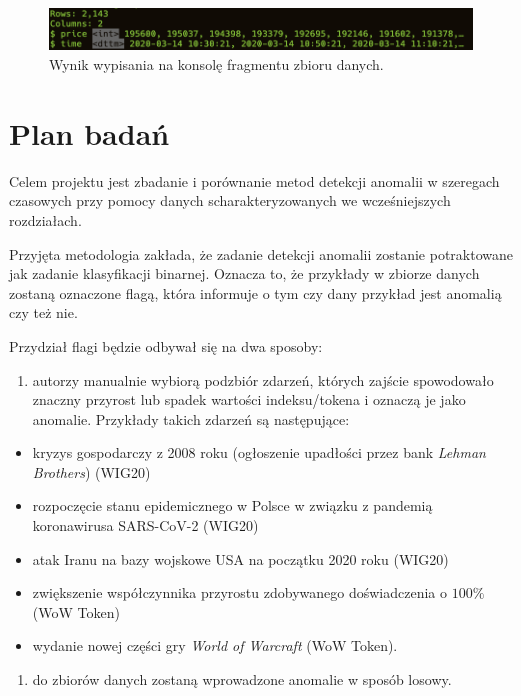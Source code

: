 \documentclass{article}
\begin{document}
\begin{figure}[H]
  \centering
  \includegraphics[width=.75\textwidth]{./images/wt-glimpse.png}
  \caption{Wynik wypisania na konsolę fragmentu zbioru danych.}
\end{figure}


\section{Plan badań \label{r6}}

Celem projektu jest zbadanie i porównanie metod detekcji anomalii w
szeregach czasowych przy pomocy danych scharakteryzowanych we
wcześniejszych rozdziałach.

Przyjęta metodologia zakłada, że zadanie detekcji anomalii zostanie
potraktowane jak zadanie klasyfikacji binarnej. Oznacza to, że przykłady
w zbiorze danych zostaną oznaczone flagą, która informuje o tym czy dany
przykład jest anomalią czy też nie.

Przydział flagi będzie odbywał się na dwa sposoby:

\begin{enumerate}
\def\labelenumi{\arabic{enumi}.}
\item
  autorzy manualnie wybiorą podzbiór zdarzeń, których zajście
  spowodowało znaczny przyrost lub spadek wartości indeksu/tokena i
  oznaczą je jako anomalie. Przykłady takich zdarzeń są następujące:
\end{enumerate}

\begin{itemize}
  \item kryzys gospodarczy z 2008 roku (ogłoszenie upadłości przez bank \emph{Lehman Brothers}) (WIG20)
\item rozpoczęcie stanu epidemicznego w Polsce w związku z pandemią koronawirusa SARS-CoV-2 (WIG20)
\item atak Iranu na bazy wojskowe USA na początku 2020 roku (WIG20)
\item zwiększenie współczynnika przyrostu zdobywanego doświadczenia o $100 \%$ (WoW Token)
\item wydanie nowej części gry \emph{World of Warcraft} (WoW Token).
\end{itemize}

\begin{enumerate}
\def\labelenumi{\arabic{enumi}.}
\setcounter{enumi}{1}
\item
  do zbiorów danych zostaną wprowadzone anomalie w sposób losowy.
\end{enumerate}
\end{document}
